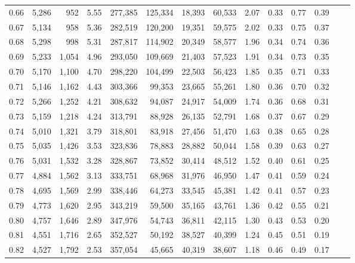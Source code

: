 \begin{tabular}{rrrrrrrrrrrrrr}
0.66 &  5,286 &    952 &     5.55 &  277,385 &  125,334 &  18,393 &  60,533 &  2.07 &  0.33 &  0.77 &      0.39 \\
0.67 &  5,134 &    958 &     5.36 &  282,519 &  120,200 &  19,351 &  59,575 &  2.02 &  0.33 &  0.75 &      0.37 \\
0.68 &  5,298 &    998 &     5.31 &  287,817 &  114,902 &  20,349 &  58,577 &  1.96 &  0.34 &  0.74 &      0.36 \\
0.69 &  5,233 &  1,054 &     4.96 &  293,050 &  109,669 &  21,403 &  57,523 &  1.91 &  0.34 &  0.73 &      0.35 \\
0.70 &  5,170 &  1,100 &     4.70 &  298,220 &  104,499 &  22,503 &  56,423 &  1.85 &  0.35 &  0.71 &      0.33 \\
0.71 &  5,146 &  1,162 &     4.43 &  303,366 &   99,353 &  23,665 &  55,261 &  1.80 &  0.36 &  0.70 &      0.32 \\
0.72 &  5,266 &  1,252 &     4.21 &  308,632 &   94,087 &  24,917 &  54,009 &  1.74 &  0.36 &  0.68 &      0.31 \\
0.73 &  5,159 &  1,218 &     4.24 &  313,791 &   88,928 &  26,135 &  52,791 &  1.68 &  0.37 &  0.67 &      0.29 \\
0.74 &  5,010 &  1,321 &     3.79 &  318,801 &   83,918 &  27,456 &  51,470 &  1.63 &  0.38 &  0.65 &      0.28 \\
0.75 &  5,035 &  1,426 &     3.53 &  323,836 &   78,883 &  28,882 &  50,044 &  1.58 &  0.39 &  0.63 &      0.27 \\
0.76 &  5,031 &  1,532 &     3.28 &  328,867 &   73,852 &  30,414 &  48,512 &  1.52 &  0.40 &  0.61 &      0.25 \\
0.77 &  4,884 &  1,562 &     3.13 &  333,751 &   68,968 &  31,976 &  46,950 &  1.47 &  0.41 &  0.59 &      0.24 \\
0.78 &  4,695 &  1,569 &     2.99 &  338,446 &   64,273 &  33,545 &  45,381 &  1.42 &  0.41 &  0.57 &      0.23 \\
0.79 &  4,773 &  1,620 &     2.95 &  343,219 &   59,500 &  35,165 &  43,761 &  1.36 &  0.42 &  0.55 &      0.21 \\
0.80 &  4,757 &  1,646 &     2.89 &  347,976 &   54,743 &  36,811 &  42,115 &  1.30 &  0.43 &  0.53 &      0.20 \\
0.81 &  4,551 &  1,716 &     2.65 &  352,527 &   50,192 &  38,527 &  40,399 &  1.24 &  0.45 &  0.51 &      0.19 \\
0.82 &  4,527 &  1,792 &     2.53 &  357,054 &   45,665 &  40,319 &  38,607 &  1.18 &  0.46 &  0.49 &      0.17 \\

\end{tabular}
